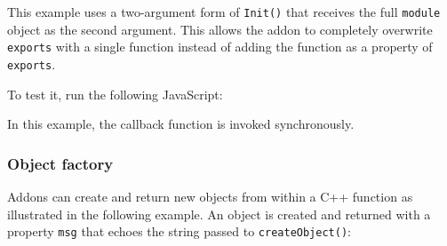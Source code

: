 \begin{Shaded}
\begin{Highlighting}[]
\OperatorTok{(}\OperatorTok{\textless{}}\OperatorTok{\textgreater{}}\OperatorTok{,}\OperatorTok{\textless{}}\OperatorTok{\textgreater{}} \OperatorTok{)} \OperatorTok{\{}
\OperatorTok{(}\OperatorTok{,} \OperatorTok{,}\OperatorTok{);}
\OperatorTok{\}}

\OperatorTok{(}\OperatorTok{,}\OperatorTok{)}

\OperatorTok{\}}  
\end{Highlighting}
\end{Shaded}

This example uses a two-argument form of \texttt{Init()} that receives
the full \texttt{module} object as the second argument. This allows the
addon to completely overwrite \texttt{exports} with a single function
instead of adding the function as a property of \texttt{exports}.

To test it, run the following JavaScript:

\begin{Shaded}
\begin{Highlighting}[]
\OperatorTok{=} \NormalTok{(}\NormalTok{)}\OperatorTok{;}

\KeywordTok{=\textgreater{}}\NormalTok{ \{}
  \OperatorTok{;}
\NormalTok{\})}\OperatorTok{;}
\end{Highlighting}
\end{Shaded}

In this example, the callback function is invoked synchronously.

\subsubsection{Object factory}\label{object-factory}

Addons can create and return new objects from within a C++ function as
illustrated in the following example. An object is created and returned
with a property \texttt{msg} that echoes the string passed to
\texttt{createObject()}:

